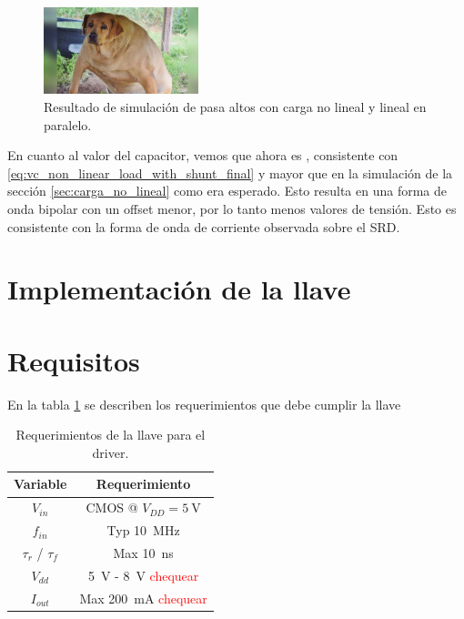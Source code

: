 \begin{figure}[tbp]
    \centering
    \includegraphics[width=0.4\textwidth]{images/placeholder.jpg}
    \caption{Resultado de simulación de pasa altos con carga no lineal y lineal
    en paralelo.}
    \label{fig:highpass_non_linear_w_shunt_simulation_result}
\end{figure}

En cuanto al valor del capacitor, vemos que ahora es , consistente con
\ref{eq:vc_non_linear_load_with_shunt_final} y mayor que en la simulación de la
sección \ref{sec:carga_no_lineal} como era esperado. Esto resulta en una forma
de onda bipolar con un offset menor, por lo tanto menos valores de tensión. Esto
es consistente con la forma de onda de corriente observada sobre el SRD.

\section{Implementación de la llave}

\section{Requisitos}

En la tabla \ref{tab:llave_requirements} se describen los requerimientos que
debe cumplir la llave

\begin{table}
\centering
\begin{tabular}{c|c}
\hline
    Variable & Requerimiento \\
\hline
    $V_{in}$                &   CMOS @ $V_{DD}=\qty{5}{\volt}$    \\
    $f_{in}$                &   Typ \qty{10}{\mega\hertz} \\
    $\tau_{r}$ / $\tau_{f}$ &   Max \qty{10}{\nano\second} \\
    $V_{dd}$                &   \qty{5}{\volt} - \qty{8}{\volt} \textcolor{red}{chequear} \\
    $I_{out}$               &   Max \qty{200}{\milli\ampere} \textcolor{red}{chequear}  \\
\hline
\end{tabular}
\caption{Requerimientos de la llave para el driver.}
\label{tab:llave_requirements}
\end{table}

